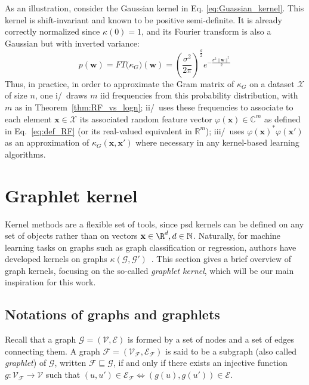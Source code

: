 As an illustration, consider the Gaussian kernel in Eq. \ref{eq:Guassian_kernel}. This kernel is shift-invariant and known to be positive semi-definite. It is already correctly normalized since $\kappa(0) = 1$, and its Fourier transform is also a Gaussian but with inverted variance:
\[p(\mathbf{w})=FT\big(\kappa_G\big)(\mathbf{w})=\left(\frac{\sigma^2}{2\pi}\right)^\frac{d}{2}e^{-\frac{\sigma^2\|\mathbf{w}\|^2}{2}}\]
Thus, in practice, in order to approximate the Gram matrix of $\kappa_G$ on a dataset $\mathcal{X}$ of size $n$, one i/~draws $m$ iid frequencies from this probability distribution, with $m$ as in Theorem~\ref{thm:RF_vs_logn}; ii/~uses these frequencies to associate to each element $\mathbf{x}\in\mathcal{X}$ its associated random feature vector $\varphi(\mathbf{x})\in\mathbb{C}^m$ as defined in Eq.~\eqref{eq:def_RF}  (or its real-valued equivalent in $\mathbb{R}^m$); iii/~uses $\varphi(\mathbf{x})^*\varphi(\mathbf{x}')$ as an approximation of $\kappa_G(\mathbf{x},\mathbf{x}')$ where necessary in any kernel-based learning algorithms.

\section{Graphlet kernel}
Kernel methods are a flexible set of tools, since psd kernels can be defined on any set of objects rather than on vectors $\mathbf{x}\in \R^d, d\in \mathbb{N}$. Naturally, for machine learning tasks on graphs such as graph classification or regression, authors have developed kernels on graphs $\kappa(\mathcal{G},\mathcal{G}')$~\citep{kriege_graph_kernels}. This section gives a brief overview of graph kernels, focusing on the so-called \emph{graphlet kernel}, which will be our main inspiration for this work. 

\subsection{Notations of graphs and graphlets}
Recall that a graph $\mathcal{G} = (\mathcal{V}, \mathcal{E})$ is formed by a set of nodes and a set of edges connecting them. A graph $\mathcal{F}=(\mathcal{V}_\mathcal{F},\mathcal{E}_\mathcal{F})$ is said to be a subgraph (also called \emph{graphlet}) of $\mathcal{G}$, written $\mathcal{F}\sqsubseteq \mathcal{G}$, if and only if there exists an injective function $g:\mathcal{V}_\mathcal{F}\xrightarrow{} \mathcal{V}$ such that $(u,u')\in \mathcal{E}_\mathcal{F} \Leftrightarrow{(g(u),g(u'))\in \mathcal{E}}$.

